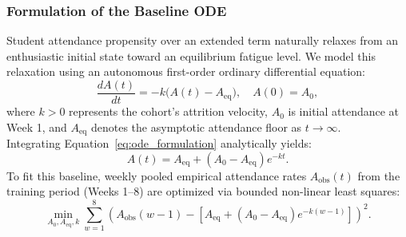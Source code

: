 \documentclass{article}
\begin{document}
\subsubsection{Formulation of the Baseline ODE}
Student attendance propensity over an extended term naturally relaxes from an enthusiastic initial state toward an equilibrium fatigue level. We model this relaxation using an autonomous first-order ordinary differential equation:
\begin{equation}
    \frac{dA(t)}{dt} = -k \bigl( A(t) - A_{\mathrm{eq}} \bigr), \quad A(0) = A_0,
    \label{eq:ode_formulation}
\end{equation}
where $k > 0$ represents the cohort's attrition velocity, $A_0$ is initial attendance at Week 1, and $A_{\mathrm{eq}}$ denotes the asymptotic attendance floor as $t \to \infty$. 
\\
Integrating Equation~\eqref{eq:ode_formulation} analytically yields:
\begin{equation}
    A(t) = A_{\mathrm{eq}} + (A_0 - A_{\mathrm{eq}}) e^{-kt}.
    \label{eq:ode_solution}
\end{equation}
To fit this baseline, weekly pooled empirical attendance rates $A_{\mathrm{obs}}(t)$ from the training period (Weeks 1--8) are optimized via bounded non-linear least squares:
\begin{equation}
    \min_{A_0, A_{\mathrm{eq}}, k} \sum_{w=1}^{8} \left( A_{\mathrm{obs}}(w-1) - \left[ A_{\mathrm{eq}} + (A_0 - A_{\mathrm{eq}}) e^{-k(w-1)} \right] \right)^2.
\end{equation}
\end{document}
